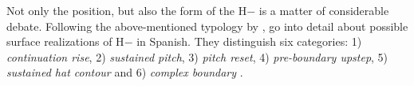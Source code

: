 
Not only the position, but also the form of the H$-$ is a matter of considerable debate. Following the above-mentioned  typology by \citet{FrotaETAL.2007}, \citet{GabrielFeldhausenPeskova2011} go into detail about possible surface realizations of H$-$ in Spanish. They distinguish six categories: 1) \textit{continuation rise}, 2) \textit{sustained pitch}, 3) \textit{pitch reset}, 4) \textit{pre-boundary upstep}, 5) \textit{sustained hat contour} and 6) \textit{complex boundary} \citep[163--170]{GabrielFeldhausenPeskova2011}.


